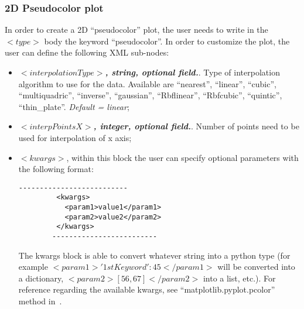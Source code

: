 \subsubsection{2D Pseudocolor plot}
In order to create a 2D ``pseudocolor'' plot, the user needs to write in the $<type>$ body the keyword ``pseudocolor''. In order to customize the plot, the user can define the following XML sub-nodes:
  \begin{itemize}
     \item $<interpolationType>$\textbf{\textit{, string, optional  field.}}. Type of interpolation algorithm to use for the data. Available are ``nearest'', ``linear'', ``cubic'', ``multiquadric'', ``inverse'', ``gaussian'', ``Rbflinear'', ``Rbfcubic'', ``quintic'', ``thin\_plate''. \textit{Default = linear};
     \item $<interpPointsX>$\textbf{\textit{, integer, optional  field.}}. Number of points need to be used for interpolation of x axis;
 \item \textit{$<kwargs>$},  within this block the user can specify optional parameters with the following format:
        \begin{lstlisting}[style=XML]
        --------------------------
         <kwargs>
           <param1>value1</param1>
           <param2>value2</param2>
         </kwargs>
        -------------------------
       \end{lstlisting}
         The kwargs block is able to convert whatever string into a python type (for example $<param1>{'1stKeyword':45}</param1>$ will be converted into a dictionary, $<param2>[56,67]</param2>$ into a list, etc.). For reference regarding the available kwargs, see ``matplotlib.pyplot.pcolor'' method in~\cite{MatPlotLib}.
    \end{itemize}


